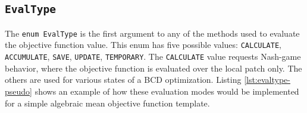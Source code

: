 \documentclass{article}
\begin{document}
\subsection{\texttt{EvalType}}
\label{sec:EvalType}

The \texttt{enum EvalType} is the first argument to any of the methods used to evaluate the objective function value.  This enum has five possible values: \texttt{CALCULATE}, \texttt{ACCUMULATE}, \texttt{SAVE}, \texttt{UPDATE}, \texttt{TEMPORARY}.  The \texttt{CALCULATE} value requests Nash-game behavior, where the objective function is evaluated over the local patch only.  The others are used for various states of a BCD optimization.  Listing \ref{lst:evaltype-pseudo} shows an example of how these evaluation modes would be implemented for a simple algebraic mean objective function template.
\end{document}

